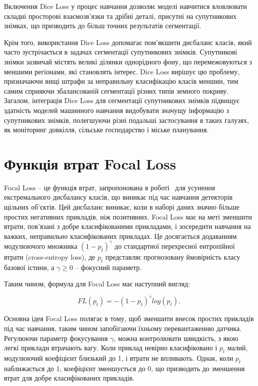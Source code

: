 Включення Dice Loss у процес навчання дозволяє моделі
навчитися вловлювати складні просторові взаємозв'язки
та дрібні деталі, присутні на супутникових знімках,
що призводить до більш точних результатів сегментації.

Крім того, використання Dice Loss допомагає
пом'якшити дисбаланс класів, який часто зустрічається
в задачах сегментації супутникових знімків. Супутникові
знімки зазвичай містять великі ділянки однорідного фону,
що перемежовуються з меншими регіонами, які становлять
інтерес. Dice Loss вирішує цю проблему,
призначаючи вищі штрафи за неправильну
класифікацію класів меншин, тим самим сприяючи
збалансованій сегментації різних типів земного покриву.
Загалом, інтеграція Dice Loss для
сегментації супутникових знімків підвищує
здатність моделей машинного навчання видобувати значущу
інформацію з супутникових знімків, полегшуючи різні
подальші застосування в таких галузях, як моніторинг
довкілля, сільське господарство і міське планування.

\section{Функція втрат Focal Loss}

Focal Loss -- це функція втрат, запропонована в роботі~\cite{lin2017} для
усунення екстремального дисбалансу класів, що виникає під час навчання
детекторів щільних об'єктів. Цей дисбаланс виникає, коли в наборі даних значно
більше простих негативних прикладів, ніж позитивних. Focal Loss має на меті
зменшити втрати, пов'язані з добре класифікованими прикладами, і зосередити
навчання на важких, неправильно класифікованих прикладах. Це досягається
додаванням модулюючого множника $(1 - p_t)^\gamma$ до стандартної перехресної
ентропійної втрати (cross-entropy loss), де $p_t$ представляє прогнозовану
ймовірність класу базової істини, а $\gamma \geq 0$ -- фокусний параметр.

Таким чином, формула для Focal Loss має наступний вигляд:

\begin{equation*}
    FL(p_t) = -(1-p_t)^\gamma log(p_t).
\end{equation*}

Основна ідея Focal Loss полягає в тому,
щоб зменшити внесок простих прикладів під час навчання,
таким чином запобігаючи їхньому перевантаженню датчика.
Регулюючи параметр фокусування $\gamma$, можна контролювати швидкість,
з якою легкі приклади втрачають вагу. Коли приклад
невірно класифіковано і $p_t$ малий, модулюючий коефіцієнт близький до
1, і втрати не впливають. Однак, коли $p_t$ наближається до 1,
коефіцієнт зменшується до 0, що призводить до зменшення втрат
для добре класифікованих прикладів.

